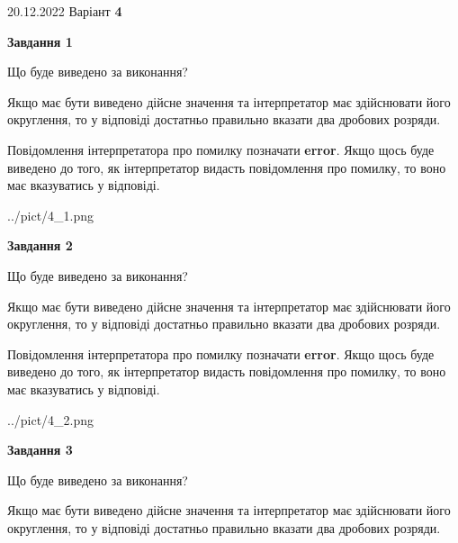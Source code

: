 \documentclass[12pt, ukrainian]{article}
\begin{document}
{20.12.2022 Варіант \No \textbf { 4 }\par}
{
\begin {Large}

{\begin {center}\textbf{Завдання 1}\end {center}}\par
Що буде виведено за виконання? \par

Якщо має бути виведено дійсне значення та інтерпретатор має здійснювати його округлення, 
то у відповіді достатньо правильно вказати два дробових розряди.

Повідомлення інтерпретатора про помилку позначати \textbf{error}.
Якщо щось буде виведено до того, як інтерпретатор видасть повідомлення про помилку, 
то воно має вказуватись у відповіді. \par

\begin{center}
	{../pict/4_1.png}
\end{center}
\newpage

{\begin {center}\textbf{Завдання 2}\end {center}}\par
Що буде виведено за виконання? \par

Якщо має бути виведено дійсне значення та інтерпретатор має здійснювати його округлення, 
то у відповіді достатньо правильно вказати два дробових розряди.

Повідомлення інтерпретатора про помилку позначати \textbf{error}.
Якщо щось буде виведено до того, як інтерпретатор видасть повідомлення про помилку, 
то воно має вказуватись у відповіді. \par

\begin{center}
	{../pict/4_2.png}
\end{center}
\newpage

{\begin {center}\textbf{Завдання 3}\end {center}}\par
Що буде виведено за виконання? \par

Якщо має бути виведено дійсне значення та інтерпретатор має здійснювати його округлення, 
то у відповіді достатньо правильно вказати два дробових розряди.


\end{Large}}
\end{document}
